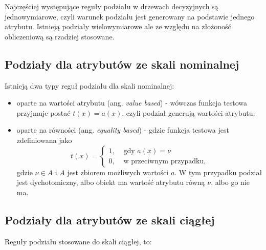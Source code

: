 \documentclass[]{book}
\providecommand{\tightlist}{%
  \setlength{\itemsep}{0pt}\setlength{\parskip}{0pt}}
\theoremstyle{plain}
\theoremstyle{definition}
\theoremstyle{definition}
\theoremstyle{definition}
\theoremstyle{definition}
\theoremstyle{remark}
\begin{document}
Najczęściej występujące reguły podziału w drzewach decyzyjnych są jednowymiarowe, czyli warunek podziału jest generowany na podstawie jednego atrybutu. Istnieją podziały wielowymiarowe ale ze względu na złożoność obliczeniową są rzadziej stosowane.

\hypertarget{podziay-dla-atrybutow-ze-skali-nominalnej}{%
\subsection{Podziały dla atrybutów ze skali nominalnej}\label{podziay-dla-atrybutow-ze-skali-nominalnej}}

Istnieją dwa typy reguł podziału dla skali nominalnej:

\begin{itemize}
\tightlist
\item
  oparte na wartości atrybutu (ang. \emph{value based}) - wówczas funkcja testowa przyjmuje postać \(t(x)=a(x)\), czyli podział generują wartości atrybutu;
\item
  oparte na równości (ang. \emph{equality based}) - gdzie funkcja testowa jest zdefiniowana jako
  \begin{equation}
    t(x)= \begin{cases}
        1, &\text{ gdy } a(x)=\nu\\
        0, & \text{ w przeciwnym przypadku},
    \end{cases}
  \end{equation}
  gdzie \(\nu\in A\) i \(A\) jest zbiorem możliwych wartości \(a\). W tym przypadku podział jest dychotomiczny, albo obiekt ma wartość atrybutu równą \(\nu\), albo go nie ma.
\end{itemize}

\hypertarget{podziay-dla-atrybutow-ze-skali-ciagej}{%
\subsection{Podziały dla atrybutów ze skali ciągłej}\label{podziay-dla-atrybutow-ze-skali-ciagej}}

Reguły podziału stosowane do skali ciągłej, to:
\end{document}
